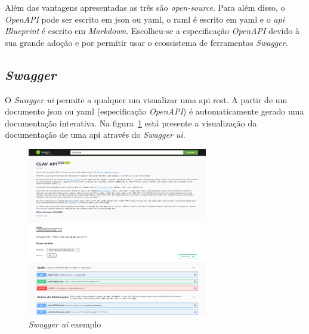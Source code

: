 Além das vantagens apresentadas as três são \textit{open-source}. Para além disso, o \textit{OpenAPI} pode ser 
escrito em \acrshort{json} ou \acrshort{yaml}, o \acrshort{raml} é escrito em \acrshort{yaml} e o 
\textit{\acrshort{api} Blueprint} é escrito em \textit{Markdown}. Escolheu-se a especificação \textit{OpenAPI} 
devido à sua grande adoção e por permitir usar o ecossistema de ferramentas \textit{Swagger}.

\subsection{\textit{Swagger }}

O \textit{Swagger \acrshort{ui}} permite a qualquer um visualizar uma \acrshort{api} \acrshort{rest}. 
A partir de um documento \acrshort{json} ou \acrshort{yaml} (especificação \textit{OpenAPI}) é automaticamente 
gerado uma documentação interativa. Na figura~\ref{fig:swaggerUI} está presente a visualização da
documentação de uma \acrshort{api} através do \textit{Swagger \acrshort{ui}}.

\begin{figure}[H]
    \centering
    \includegraphics[width=0.7\textwidth]{img/swaggerUI.png}
    \caption{\textit{Swagger \acrshort{ui}} exemplo\label{fig:swaggerUI}}
\end{figure}

